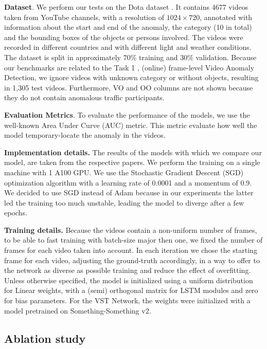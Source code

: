 \noindent\textbf{Dataset}.
We perform our tests on the Dota dataset \cite{9712446}.
It contains 4677 videos taken from YouTube channels, with a resolution of $1024 \times 720$, annotated with information about the start and end of the anomaly, the category (10 in total) and the bounding boxes of the objects or persons involved.
The videos were recorded in different countries and with different light and weather conditions.
The dataset is split in approximately $70\%$ training and $30\%$ validation.
Because our benchmarks are related to the Task 1 \cite{9712446}, (online) frame-level Video Anomaly Detection, we ignore videos with unknown category or without objects, resulting in 1,305 test videos.
Furthermore, VO and OO columns are not shown because they do not contain anomalous traffic participants.

\noindent\textbf{Evaluation Metrics}.
To evaluate the performance of the models, we use the well-known Area Under Curve (AUC) metric.
This metric evaluate how well the model temporary-locate the anomaly in the videos.

\noindent\textbf{Implementation details.}
The results of the models with which we compare our model, are taken from the respective papers.
We perform the training on a single machine with 1 A100 GPU.
We use the Stochastic Gradient Descent (SGD) optimization algorithm with a learning rate of 0.0001 and a momentum of 0.9.
We decided to use SGD instead of Adam because in our experiments the latter led the training too much unstable, leading the model to diverge after a few epochs.

\noindent\textbf{Training details.}
Because the videos contain a non-uniform number of frames, to be able to fast training with batch-size major then one, we fixed the number of frames for each video taken into account.
In each iteration we chose the starting frame for each video, adjusting the ground-truth accordingly, in a way to offer to the network as diverse as possible training and reduce the effect of overfitting.
Unless otherwise specified, the model is initialized using a uniform distribution for Linear weights, with a (semi) orthogonal matrix for LSTM modules and zero for bias parameters.
For the VST Network, the weights were initialized with a model pretrained on Something-Something v2.

\subsection{Ablation study}

